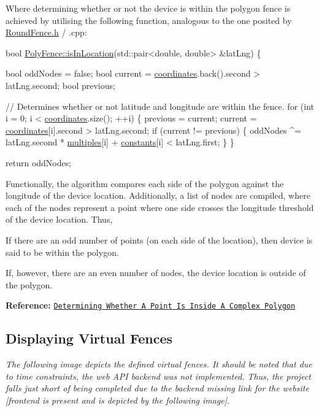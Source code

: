  Where determining whether or not the device is within the polygon fence is achieved by utilising the following function, analogous to the one posited by \hyperlink{_round_fence_8h}{Round\+Fence.\+h} / .cpp\+:


\begin{DoxyCode}
\textcolor{keywordtype}{bool} \hyperlink{class_poly_fence_af8116af5be86f8426102985c3dbcdf5e}{PolyFence::isInLocation}(std::pair<double, double> &latLng)
\{

    \textcolor{keywordtype}{bool} oddNodes = \textcolor{keyword}{false};
    \textcolor{keywordtype}{bool} current = \hyperlink{class_poly_fence_ae8e0c55e745979cab104ef80aeb4b418}{coordinates}.back().second > latLng.second;
    \textcolor{keywordtype}{bool} previous;

    \textcolor{comment}{// Determines whether or not latitude and longitude are within the fence.}
    \textcolor{keywordflow}{for} (\textcolor{keywordtype}{int} i = 0; i < \hyperlink{class_poly_fence_ae8e0c55e745979cab104ef80aeb4b418}{coordinates}.size(); ++i) \{
        previous = current;
        current = \hyperlink{class_poly_fence_ae8e0c55e745979cab104ef80aeb4b418}{coordinates}[i].second > latLng.second;
        \textcolor{keywordflow}{if} (current != previous) \{
            oddNodes ^= latLng.second * \hyperlink{class_poly_fence_a2204e62b61b0e3c335734fa0b6cf0728}{multiples}[i] + \hyperlink{class_poly_fence_a24c99bb8a45f86bdf51cd3f22ef0f174}{constants}[i] < latLng.first;
        \}
    \}

    \textcolor{keywordflow}{return} oddNodes;
\end{DoxyCode}
 Functionally, the algorithm compares each side of the polygon against the longitude of the device location. Additionally, a list of nodes are compiled, where each of the nodes represent a point where one side crosses the longitude threshold of the device location. Thus,


\begin{DoxyItemize}
\item If there are an odd number of points (on each side of the location), then device is said to be within the polygon.
\item If, however, there are an even number of nodes, the device location is outside of the polygon.
\end{DoxyItemize}

{\bfseries Reference\+:} \href{http://alienryderflex.com/polygon/?fbclid=IwAR1iLUkzQZnRRCWvPyUjvrYXU6W259FduDmq8NhDPSHMaUAtOmUnE_HEoAA}{\tt Determining Whether A Point Is Inside A Complex Polygon}

\subsection*{Displaying Virtual Fences}

{\itshape The following image depicts the defined virtual fences. It should be noted that due to time constraints, the web A\+PI backend was not implemented. Thus, the project falls just short of being completed due to the backend missing link for the website \mbox{[}frontend is present and is depicted by the following image\mbox{]}.}  